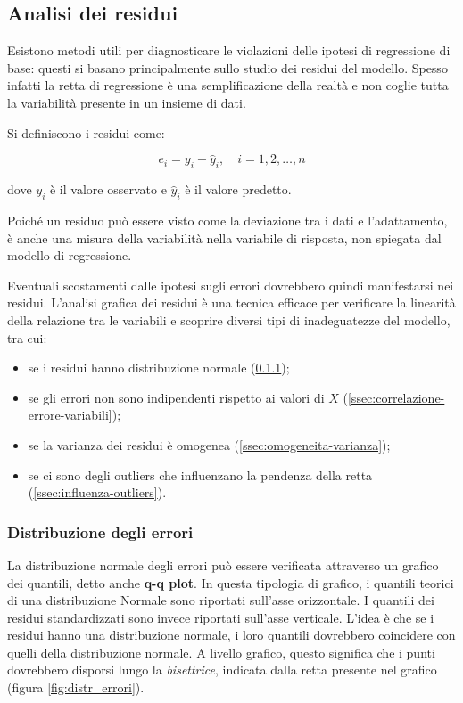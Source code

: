 \subsection{Analisi dei residui}\label{ssec:regressione-residui}
Esistono metodi utili per diagnosticare le violazioni delle ipotesi di regressione di base: questi si basano principalmente sullo studio dei residui del modello. Spesso infatti la retta di regressione è una semplificazione della realtà e non coglie tutta la variabilità presente in un insieme di dati. \cite{residui_pozzolo}

Si definiscono i residui come:

$$e_{i}=y_{i}-\hat{y}_{i}, \quad i=1,2, \ldots, n$$\smallskip

dove $y_{i}$ è il valore osservato e $\hat{y}_{i}$ è il valore predetto.

Poiché un residuo può essere visto come la deviazione tra i dati e l'adattamento, è anche una misura della variabilità nella variabile di risposta, non spiegata dal modello di regressione. \cite{introduction_to_lr}

Eventuali scostamenti dalle ipotesi sugli errori dovrebbero quindi manifestarsi nei residui. L'analisi grafica dei residui è una tecnica efficace per verificare la linearità della relazione tra le variabili e  scoprire diversi tipi di inadeguatezze del modello, tra cui: 
\begin{itemize}
  \item se i residui hanno distribuzione normale (\ref{ssec:distr-errori});
  \item se gli errori non sono indipendenti rispetto ai valori di $X$ (\ref{ssec:correlazione-errore-variabili});
  \item se la varianza dei residui è omogenea (\ref{ssec:omogeneita-varianza});
  \item se ci sono degli outliers che influenzano la pendenza della retta (\ref{ssec:influenza-outliers}).
\end{itemize}

\subsubsection{Distribuzione degli errori}\label{ssec:distr-errori}
La distribuzione normale degli errori può essere verificata attraverso un grafico dei quantili, detto anche \textbf{q-q plot}.
In questa tipologia di grafico, i quantili teorici di una distribuzione Normale sono riportati sull’asse orizzontale. I quantili dei residui standardizzati sono invece riportati sull’asse verticale.
L’idea è che se i residui hanno una distribuzione normale, i loro quantili dovrebbero coincidere con quelli della distribuzione normale. A livello grafico, questo significa che i punti dovrebbero disporsi lungo la \textit{bisettrice}, indicata dalla retta presente nel grafico (figura \ref{fig:distr_errori}).


